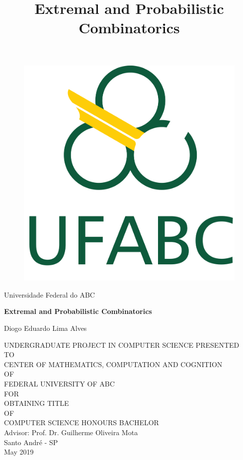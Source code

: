 \documentclass[12pt,twoside,a4paper,bibliography=totocnumbered]{book}
\numberwithin{equation}{section}
\theoremstyle{remark}
\begin{document}

\title{Extremal and Probabilistic Combinatorics}

      \begin{figure}[h!]%
        \centering%
        \includegraphics[scale=0.2]{Figuras/logo.png}%
      \end{figure}%
\begin{center}
Universidade Federal do ABC\\

\vspace{2cm}

{
\fontsize{18pt}{\baselineskip}\selectfont \bf
Extremal and Probabilistic Combinatorics
}

\vspace{2cm}

Diogo Eduardo Lima Alves\\

\vspace{2cm}

UNDERGRADUATE PROJECT IN COMPUTER SCIENCE PRESENTED\\
TO\\
CENTER OF MATHEMATICS, COMPUTATION AND COGNITION\\
OF\\
FEDERAL UNIVERSITY OF ABC\\
FOR\\
OBTAINING TITLE\\
OF\\
COMPUTER SCIENCE HONOURS BACHELOR\\
\vspace{2cm}
Advisor: Prof. Dr. Guilherme Oliveira Mota\\
\vfill
Santo André - SP\\
May 2019
\end{center}
\end{document}
